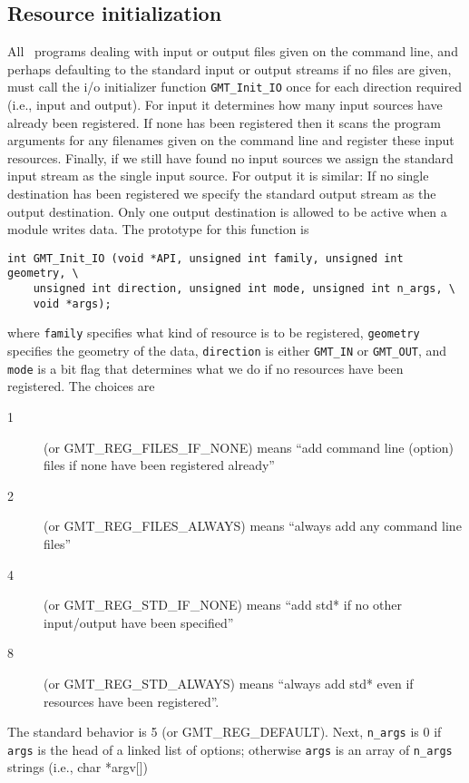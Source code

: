 \documentclass[11pt]{report}
\begin{document}
\subsection{Resource initialization}
All \GMT\ programs dealing with input or output files given on the command line, and perhaps defaulting to
the standard input or output streams if no files are given, must call the i/o initializer function
\texttt{GMT\_Init\_IO} once for each direction required (i.e., input and output).
For input it determines how many input sources have already been registered.
If none has been registered then it scans the program arguments for any filenames given on the command line and register
these input resources.  Finally, if we still have found no input sources we assign the standard input stream
as the single input source.  For output it is similar: If no single destination has been registered we specify the standard output stream
as the output destination.  Only one output destination is allowed to be active when a module writes data.
The prototype for this function is

\begin{verbatim}
int GMT_Init_IO (void *API, unsigned int family, unsigned int geometry, \
    unsigned int direction, unsigned int mode, unsigned int n_args, \
    void *args);
\end{verbatim}
where \texttt{family} specifies what kind of resource is to be registered,
\texttt{geometry} specifies the geometry of the data,
\texttt{direction} is either \texttt{GMT\_IN} or \texttt{GMT\_OUT}, and
\texttt{mode} is a bit flag that determines what we do if no resources have been
registered. The choices are
\begin{description}
	\item [1] (or GMT\_REG\_FILES\_IF\_NONE) means ``add command line (option) files if none have been registered already''
	\item [2] (or GMT\_REG\_FILES\_ALWAYS) means ``always add any command line files''
	\item [4] (or GMT\_REG\_STD\_IF\_NONE) means ``add std* if no other input/output have been specified''
	\item [8] (or GMT\_REG\_STD\_ALWAYS) means ``always add std* even if resources have been registered''.
\end{description}
The standard behavior is 5 (or GMT\_REG\_DEFAULT).
Next, \texttt{n\_args} is 0 if \texttt{args} is the head of a linked list of options;
otherwise \texttt{args} is an array of \texttt{n\_args} strings (i.e., char *argv[])
\end{document}
